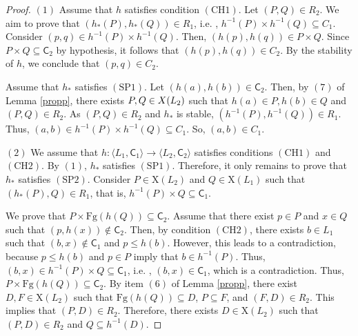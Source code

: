 \documentclass[10pt,a4paper]{amsart}
\begin{document}
\begin{proof}
$(1)$ Assume that $h$ satisfies condition $\mathrm{\mathrm{(CH1)}}$.
Let $(P,Q)\in R_{2}$. We aim to prove that $(h_{*}(P),h_{*}(Q))\in R_{1}$,
i.e. , $h^{-1}(P)\times h^{-1}(Q)\subseteq C_{1}$. Consider $(p,q)\in h^{-1}(P)\times h^{-1}(Q)$.
Then, $(h(p),h(q))\in P\times Q$. Since $P\times Q\subseteq\mathsf{C}_{2}$
by hypothesis, it follows that $(h(p),h(q))\in C_{2}$. By the stability
of $h$, we conclude that $(p,q)\in C_{2}$.

Assume that $h_{*}$ satisfies $\mathrm{(SP1)}$. Let $(h(a),h(b))\in\mathsf{C}_{2}$.
Then, by $(7)$ of Lemma \ref{propp}, there exists $P,Q\in{\rm {X}}(L_{2})$
such that $h(a)\in P,h(b)\in Q$ and $(P,Q)\in R_{2}$. As $(P,Q)\in R_{2}$
and $h_{*}$ is stable, $(h^{-1}(P),h^{-1}(Q))\in R_{1}$. Thus, $(a,b)\in h^{-1}(P)\times h^{-1}(Q)\subseteq C_{1}$.
So, $(a,b)\in C_{1}$.

$(2)$ We assume that $h\colon\langle L_{1},\mathsf{C}_{1}\rangle\longrightarrow\langle L_{2},\mathsf{C}_{2}\rangle$
satisfies conditions $\mathrm{\mathrm{(CH1)}}$ and $\mathrm{\mathrm{\mathrm{\mathrm{(CH2)}}}}$.
By $(1)$, $h_{*}$ satisfies $\mathrm{(SP1)}$. Therefore, it only
remains to prove that $h_{*}$ satisfies $\mathrm{(SP2)}$. Consider
$P\in\mathrm{X}(L_{2})$ and $Q\in\mathrm{X}(L_{1})$ such that $(h_{*}(P),Q)\in R_{1}$,
that is, $h^{-1}(P)\times Q\subseteq\mathsf{C}_{1}$.

We prove that $P\times\mathrm{Fg}(h(Q))\subseteq\mathsf{C}_{2}.$
Assume that there exist $p\in P$ and $x\in Q$ such that $(p,h(x))\notin\mathsf{C}_{2}$.
Then, by condition $\mathrm{(CH2)}$, there exists $b\in L_{1}$ such
that $(b,x)\notin\mathsf{C}_{1}$ and $p\leq h(b)$. However, this
leads to a contradiction, because $p\leq h(b)$ and $p\in P$ imply
that $b\in h^{-1}(P)$. Thus, $(b,x)\in h^{-1}(P)\times Q\subseteq\mathsf{C}_{1}$,
i.e. , $(b,x)\in\mathsf{C}_{1}$, which is a contradiction. Thus,
$P\times\mathrm{Fg}(h(Q))\subseteq\mathsf{C}_{2}.$ By item $(6)$
of Lemma \ref{propp}, there exist $D,F\in\mathrm{X}(L_{2})$ such
that $\mathrm{Fg}(h(Q))\subseteq D$, $P\subseteq F$, and $(F,D)\in R_{2}$.
This implies that $(P,D)\in R_{2}$. Therefore, there exists $D\in\mathrm{X}(L_{2})$
such that $(P,D)\in R_{2}$ and $Q\subseteq h^{-1}(D)$.


\end{proof}
\end{document}
